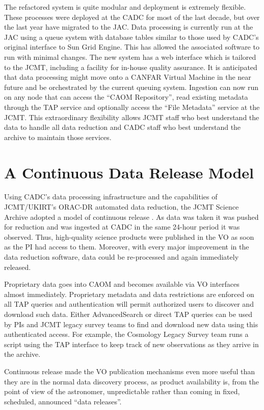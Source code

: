 \documentclass[final,authoryear,5p,times,twocolumn]{elsarticle}
\begin{document}
The refactored system is quite modular and deployment is extremely
flexible. These processes were deployed at the CADC for most of the
last decade, but over the last year have migrated to the JAC.  Data
processing is currently run at the JAC using a queue system with
database tables similar to those used by CADC's original interface to
Sun Grid Engine. This has allowed the associated software to run with
minimal changes. The new system has a web interface which is tailored
to the JCMT, including a facility for in-house quality assurance. It
is anticipated that data processing might move onto a CANFAR Virtual
Machine in the near future and be orchestrated by the current queuing
system. Ingestion can now run on any node that can access the ``CAOM
Repository'', read existing metadata through the TAP service and
optionally access the ``File Metadata'' service at the JCMT.  This
extraordinary flexibility allows JCMT staff who best understand the
data to handle all data reduction and CADC staff who best understand
the archive to maintain those services.

\section{A Continuous Data Release Model}

Using CADC's data processing infrastructure and the capabilities of
JCMT/UKIRT's ORAC-DR automated data reduction, the JCMT Science
Archive adopted a model of continuous release
\citep{2011ASPC..442..203E}. As data was taken it was pushed for
reduction and was ingested at CADC in the same 24-hour period it was
observed. Thus, high-quality science products were published in the VO
as soon as the PI had access to them. Moreover, with every major
improvement in the data reduction software, data could be re-processed
and again immediately released.

Proprietary data goes into CAOM and becomes available via VO
interfaces almost immediately. Proprietary metadata and data
restrictions are enforced on all TAP queries and authentication will
permit authorized users to discover and download such data. Either
AdvancedSearch or direct TAP queries can be used by PIs and JCMT
legacy survey teams to find and download new data using this
authenticated access. For example, the Cosmology Legacy Survey team
\citep{2013MNRAS.432...53G} runs a script using the TAP interface to
keep track of new observations as they arrive in the archive.

Continuous release made the VO publication mechanisms even more useful
than they are in the normal data discovery process, as product
availability is, from the point of view of the astronomer,
unpredictable rather than coming in fixed, scheduled, announced ``data
releases''.
\end{document}
